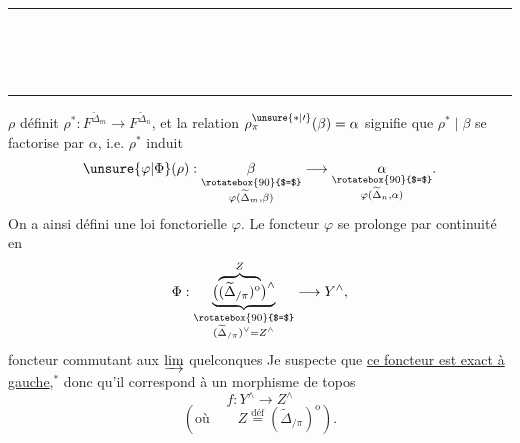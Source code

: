\begin{center}
\\
\rule{4em}{0.4pt}\\
\\
\\
\rule{1.6em}{0.4pt}
\end{center}
$\rho$ définit $\rho^*:F^{\widetilde\Delta_m}\longrightarrow F^{\widetilde\Delta_n}$, et la relation $\rho_\pi^{\unsure{*|\prime}}(\beta)=\alpha$ signifie que $\rho^*\mid\beta$ se factorise par $\alpha$, i.e. $\rho^*$ induit
\[
 \unsure{\varphi|\Phi}(\rho):
 \underset{\substack{\rotatebox{90}{$=$}\\\varphi(\widetilde\Delta_m,\beta)}}{\beta}\longrightarrow
 \underset{\substack{\rotatebox{90}{$=$}\\\varphi(\widetilde\Delta_n,\alpha)}}{\alpha}.
\]
On a ainsi défini une loi fonctorielle $\varphi$. Le foncteur $\varphi$ se prolonge par continuité en
\[
 \Phi:\underbrace{\bigl(\overbrace{(\widetilde\Delta_{/\pi})^{\mathrm o}}^{Z}\bigr)^\wedge}
 _{\substack{\rotatebox{90}{$=$}\\(\widetilde\Delta_{/\pi})^\vee=Z^\wedge}}
 \longrightarrow Y^\wedge,
\]
foncteur commutant aux $\varinjlim$ quelconques
Je suspecte que \uline{ce foncteur est exact à gauche},$^*$ donc qu'il correspond à un morphisme de topos
\[
 f:Y^\wedge\longrightarrow Z^\wedge
\]
\[
 (\text{où}\qquad Z\overset{\text{déf}}{=}(\widetilde\Delta_{/\pi})^{\mathrm o}).
\]
